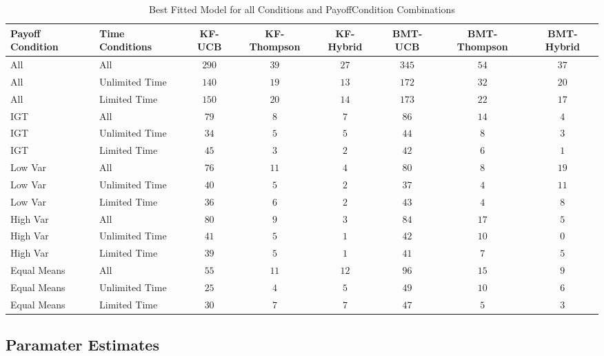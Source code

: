 \begin{table}[h!]
\begin{adjustwidth}{-2.5cm}{}
\vspace{-2mm}
\caption{Best Fitted Model for all Conditions and PayoffCondition Combinations} 
\label{tab:All_Fitted} 
\begin{tabular*}{1.5\textwidth}{@{}l@{}|l@{}|c@{}|c@{}|c@{}|c@{}|c@{}|c@{}}
\toprule
Payoff Condition&Time Conditions & KF-UCB &KF-Thompson& KF-Hybrid & BMT-UCB & BMT-Thompson & BMT-Hybrid  \\ \midrule
All&All&$290$ &$39$ &$27$ &$345$ & $54$ & $37$\\
All&Unlimited Time &$140$ &$19$ &$13$ &$172$ & $32$ &$20$\\
All&Limited Time &$150$& $20$&$14$&$173$&$22$&$17$\\
IGT&All & $79$  & $8 $& $7$ & $86$ & $14$ & $4$     \\
IGT&Unlimited Time  & $34$ & $5$ & $5$ & $44$ &$8$ & $3$ \\
IGT&Limited Time  & $45$ & $3$ & $2$ & $42$ &$6$ & $1$   \\
Low Var&All & $76$  & $11 $& $4$ & $80$ & $8$ & $19$     \\
Low Var&Unlimited Time  & $40$ & $5$ & $2$ & $37$ &$4$ & $11$ \\
Low Var&Limited Time  & $36$ & $6$ & $2$ & $43$ &$4$ & $8$   \\
High Var&All & $80$  & $9$ & $3$ & $84$ & $17$ & $5$     \\
High Var&Unlimited Time  & $41$ & $5$ & $1$ & $42$ &$10$ & $0$  \\
High Var&Limited Time  & $39$ & $5$ & $1$ & $41$ &$7$ & $5$   \\
Equal Means&All & $55$  & $11$ & $12$ & $96$ & $15$ & $9$     \\
Equal Means&Unlimited Time  & $25$ & $4$ & $5$ & $49$ &$10$ & $6$  \\
Equal Means&Limited Time  & $30$ & $7$ & $7$ & $47$ &$5$ & $3$   \\
\bottomrule
\end{tabular*}
\vspace{5mm}
\end{adjustwidth}
\end{table}

\subsection*{Paramater Estimates}

